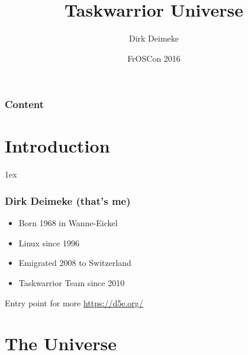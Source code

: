 \documentclass[t,handout]{beamer}
\title{Taskwarrior Universe}
\author[Deimeke, Dirk]{Dirk Deimeke}
\institute[Taskwarrior academy]{Taskwarrior academy}
\date{FrOSCon 2016}
\begin{document}
\begin{frame} %
	\titlepage
\end{frame}


\begin{frame}\frametitle{Content}
	\tableofcontents
\end{frame}

\section{Introduction}

\parskip1ex

\begin{frame}[fragile]\frametitle{Dirk Deimeke (that's me)}
    \begin{itemize}
        \item Born 1968 in Wanne-Eickel
        \item Linux since 1996
        \item Emigrated 2008 to Switzerland
        \item Taskwarrior Team since 2010
    \end{itemize}

    Entry point for more \url{https://d5e.org/}
\end{frame}

\section{The Universe}
\end{document}

